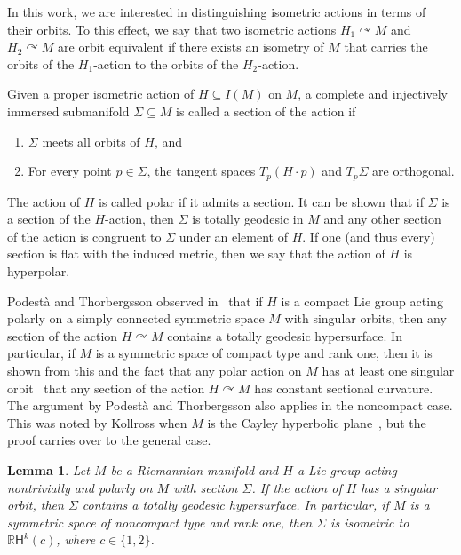 \documentclass[12pt, a4paper]{amsart}
\newcommand{\s}{\mathsf}
\newcommand{\R}{\mathbb{R}}
\newtheorem{lemma}[theorem]{Lemma}
\theoremstyle{definition}
\begin{document}
In this work, we are interested in distinguishing isometric actions in terms of their orbits.
To this effect, we say that two isometric actions $H_1 \curvearrowright M$ and $H_2 \curvearrowright M$ are orbit equivalent if there exists an isometry of $M$ that carries the orbits of the $H_1$-action to the orbits of the $H_2$-action.

Given a proper isometric action of $H\subseteq I(M)$ on $M$, a complete and injectively immersed submanifold $\Sigma \subseteq M$ is called a section of the action if
\begin{enumerate}[\rm (i)]
    \item $\Sigma$ meets all orbits of $H$, and
    \item For every point $p\in \Sigma$, the tangent spaces $T_p(H\cdot p)$ and $T_p \Sigma$ are orthogonal.
\end{enumerate}
The action of $H$ is called polar if it admits a section.
It can be shown that if $\Sigma$ is a section of the $H$-action,
then $\Sigma$ is totally geodesic in $M$ and any other section of the action
is congruent to $\Sigma$ under an element of $H$.
If one (and thus every) section is flat with the induced metric, then we say that the action of $H$ is hyperpolar.

Podestà and Thorbergsson observed in~\cite[Lemma~1A.4]{PodestaThorbergsson99} that if $H$ is a compact Lie group acting polarly on a simply connected symmetric space $M$ with singular orbits, then any section of the action $H\curvearrowright M$ contains a totally geodesic hypersurface.
In particular, if $M$ is a symmetric space of compact type and rank one, then it is shown from this and the fact that any polar action on $M$ has at least one singular orbit~\cite[Lemma~1A.2]{PodestaThorbergsson99} that any section of the action $H\curvearrowright M$ has constant sectional curvature.
The argument by Podestà and Thorbergsson also applies in the noncompact case.
This was noted by Kollross when $M$ is the Cayley hyperbolic plane~\cite[Lemma~6.1]{kollross-octonions}, but the proof carries over to the general case.

\begin{lemma}\label{lemma:singular}
    Let $M$ be a Riemannian manifold and $H$ a Lie group acting nontrivially and polarly on $M$ with section $\Sigma$.
    If the action of $H$ has a singular orbit, then $\Sigma$ contains a totally geodesic hypersurface.
    In particular, if $M$ is a symmetric space of noncompact type and rank one, then $\Sigma$ is isometric to $\R\s{H}^{k}(c)$, where $c\in \{1,2\}$.
\end{lemma}
\end{document}

